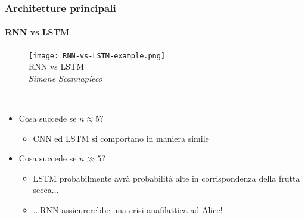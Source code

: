 %
\begin{frame}[t] \frametitle{Architetture principali}
\framesubtitle{RNN vs LSTM}
{\scriptsize
{}
	\begin{minipage}[t]{\textwidth}
		\begin{figure}
			\centering
			\texttt{[image: RNN-vs-LSTM-example.png]}
			{\tiny\\RNN vs LSTM\\\textit{\textcopyright Simone Scannapieco}}
		\end{figure}
	\end{minipage}
	\\\vspace*{.3cm}
	\begin{minipage}[t]{\textwidth}
		\begin{itemize}[leftmargin=10pt,align=right]
			\onslide<2->\item[\alert{\faArrowCircleRight}] Cosa succede se $n \approx 5$?
			\begin{itemize}[leftmargin=10pt,align=right]
				\onslide<3->\item[\alert{\faArrowCircleRight}] CNN ed LSTM si comportano in maniera simile
			\end{itemize}
			\item[\alert{\faArrowCircleRight}] Cosa succede se $n \gg 5$?
			\begin{itemize}[leftmargin=10pt,align=right]
				\onslide<5->\item[\alert{\faArrowCircleRight}] LSTM probabilmente avrà probabilità alte in corrispondenza della frutta secca$\ldots$
				\onslide<6->\item[\alert{\faArrowCircleRight}] $\ldots$RNN assicurerebbe una crisi anafilattica ad Alice!
			\end{itemize}
		\end{itemize}
	\end{minipage}
}
\end{frame}
%
